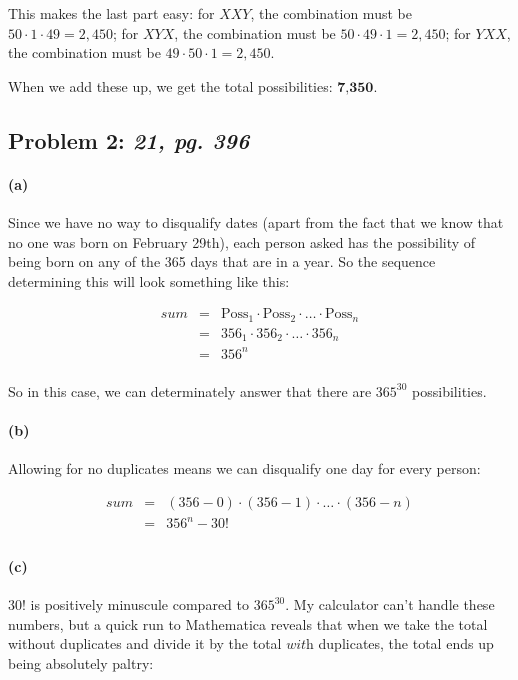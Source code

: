 \documentclass[a4paper]{article}
\begin{document}
This makes the last part easy: for $XXY$, the combination must be $50 \cdot 1 \cdot 49 = 2,450$; for $XYX$, the combination must be $50 \cdot 49 \cdot 1 = 2,450$; for $YXX$, the combination must be $49 \cdot 50 \cdot 1 = 2,450$.

When we add these up, we get the total possibilities: $\textbf{7,350}$.

\subsection*{Problem 2: \textit{21, pg. 396}}

\paragraph{(a)} Since we have no way to disqualify dates (apart from the fact that we know that no one was born on February 29th), each person asked has the possibility of being born on any of the 365 days that are in a year. So the sequence determining this will look something like this:

\begin{equation}
\begin{array}{rll}
sum & = & \mbox{Poss}_1 \cdot \mbox{Poss}_2 \cdot \ldots \cdot \mbox{Poss}_n \\
& = & 356_1 \cdot 356_2 \cdot \ldots \cdot 356_n \\
& = & 356^n \\
\end{array}
\end{equation}	

So in this case, we can determinately answer that there are $365^{30}$ possibilities.

\paragraph{(b)} Allowing for no duplicates means we can disqualify one day for every person:

\begin{equation}
\begin{array}{rll}
sum & = & (356-0) \cdot (356-1) \cdot \ldots \cdot (356-n) \\
& = & 356^n - 30! \\
\end{array}
\end{equation}	

\paragraph{(c)} $30!$ is positively minuscule compared to $365^{30}$. My calculator can't handle these numbers, but a quick run to Mathematica reveals that when we take the total without duplicates and divide it by the total $\textit{with}$ duplicates, the total ends up being absolutely paltry:
\end{document}
